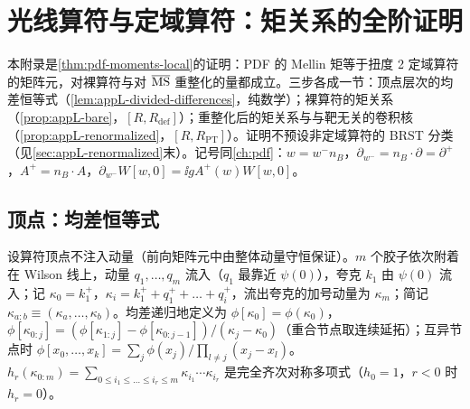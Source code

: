 \chapter{光线算符与定域算符：矩关系的全阶证明}\label{app:appL}

本附录是\cref{thm:pdf-moments-local}的证明：PDF 的 Mellin 矩等于扭度 2 定域算符的矩阵元，对裸算符与对 $\overline{\mathrm{MS}}$ 重整化的量都成立。三步各成一节：顶点层次的均差恒等式（\cref{lem:appL-divided-differences}，纯数学）；裸算符的矩关系（\cref{prop:appL-bare}，$[R,R_{\mathrm{def}}]$）；重整化后的矩关系与与靶无关的卷积核（\cref{prop:appL-renormalized}，$[R,R_{\mathrm{PT}}]$）。证明不预设非定域算符的 BRST 分类（见\cref{sec:appL-renormalized}末）。记号同\cref{ch:pdf}：$w=w^-n_B$，$\partial_{w^-}=n_B\cdot\partial=\partial^+$，$A^+=n_B\cdot A$，$\partial_{w^-}W[w,0]=\ii gA^+(w)W[w,0]$。

\section{顶点：均差恒等式}\label{sec:appL-vertices}

设算符顶点不注入动量（前向矩阵元中由整体动量守恒保证）。$m$ 个胶子依次附着在 Wilson 线上，动量 $q_1,\dots,q_m$ 流入（$q_1$ 最靠近 $\psi(0)$），夸克 $k_1$ 由 $\psi(0)$ 流入；记 $\kappa_0=k_1^+$，$\kappa_i=k_1^++q_1^++\dots+q_i^+$，流出夸克的加号动量为 $\kappa_m$；简记 $\kappa_{a:b}\equiv(\kappa_a,\dots,\kappa_b)$。均差递归地定义为 $\phi[\kappa_0]=\phi(\kappa_0)$，$\phi[\kappa_{0:j}]=(\phi[\kappa_{1:j}]-\phi[\kappa_{0:j-1}])/(\kappa_j-\kappa_0)$（重合节点取连续延拓）；互异节点时 $\phi[x_0,\dots,x_k]=\sum_j\phi(x_j)/\prod_{l\ne j}(x_j-x_l)$。$h_r(\kappa_{0:m})=\sum_{0\le i_1\le\dots\le i_r\le m}\kappa_{i_1}\cdots\kappa_{i_r}$ 是完全齐次对称多项式（$h_0=1$，$r<0$ 时 $h_r=0$）。

